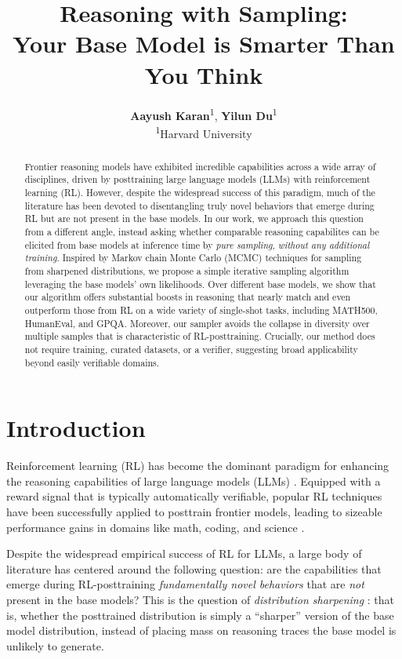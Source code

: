 \documentclass{article}
\author{%
  \textbf{Aayush Karan}\textsuperscript{1},
  \textbf{Yilun Du}\textsuperscript{1} \\[0.6em]
  \textsuperscript{1}Harvard University \\[0.6em]
  \textbf{\href{https://aakaran.github.io/reasoning_with_sampling/}
     {\textcolor{blue!60!black}{\faGlobe\enspace{Website}}}
    \quad
  \href{https://github.com/aakaran/reasoning-with-sampling}
     {\textcolor{blue!60!black}{\faGithub\enspace{Code}}}}
}
\title{Reasoning with Sampling: \\ Your Base Model is Smarter Than You Think}
\begin{document}
\maketitle


\begin{abstract}
Frontier reasoning models have exhibited incredible capabilities across a wide array of disciplines, driven by posttraining large language models (LLMs) with reinforcement learning (RL). However, despite the widespread success of this paradigm, much of the literature has been devoted to disentangling truly novel behaviors that emerge during RL but are not present in the base models. In our work, we approach this question from a different angle, instead asking whether comparable reasoning capabilites can be elicited from base models at inference time by \textit{pure sampling}, \textit{without any additional training}. Inspired by Markov chain Monte Carlo (MCMC) techniques for sampling from sharpened distributions, we propose a simple iterative sampling algorithm leveraging the base models' own likelihoods. Over different base models, we show that our algorithm offers substantial boosts in reasoning that nearly match and even outperform those from RL on a wide variety of single-shot tasks, including MATH500, HumanEval, and GPQA. Moreover, our sampler avoids the collapse in diversity over multiple samples that is characteristic of RL-posttraining. Crucially, our method does not require training, curated datasets, or a verifier, suggesting broad applicability beyond easily verifiable domains.

\end{abstract}

\section{Introduction}\label{sec:intro}
Reinforcement learning (RL) has become the dominant paradigm for enhancing the reasoning capabilities of large language models (LLMs) \citep{guo2025deepseekr1, hu2025openreasonerzero}. Equipped with a reward signal that is typically automatically verifiable, popular RL techniques have been successfully applied to posttrain frontier models, leading to sizeable performance gains in domains like math, coding, and science \citep{hendrycks2021math, li2022alphacode, rein2024gpqa}. 

Despite the widespread empirical success of RL for LLMs, a large body of literature has centered around the following question: are the capabilities that emerge during RL-posttraining \textit{fundamentally novel behaviors} that are \textit{not} present in the base models? This is the question of \textit{distribution sharpening} \citep{he2025rewarding,shao2025spuriousrewards,yue2025doesrlincentivizereasoning}: that is, whether the posttrained distribution is simply a ``sharper'' version of the base model distribution, instead of placing mass on reasoning traces the base model is unlikely to generate. 
\end{document}

